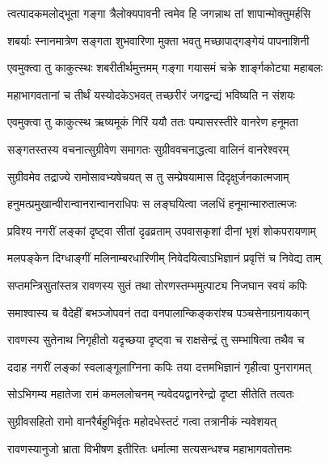 \twolineshloka
{त्वत्पादकमलोद्भूता गङ्गा त्रैलोक्यपावनी}
{त्वमेव हि जगन्नाथ तां शापान्मोक्तुमर्हसि}%




\twolineshloka
{शबर्याः स्नानमात्रेण सङ्गता शुभवारिणा}
{मुक्ता भवतु मच्छापाद्गङ्गेयं पापनाशिनी}%

\twolineshloka
{एवमुक्त्वा तु काकुत्स्थः शबरीतीर्थमुत्तमम्}
{गङ्गा गयासमं चक्रे शार्ङ्गकोट्या महाबलः}%

\twolineshloka
{महाभागवतानां च तीर्थं यस्योदकेऽभवत्}
{तच्छरीरं जगद्वन्द्यं भविष्यति न संशयः}%

\twolineshloka
{एवमुक्त्वा तु काकुत्स्थ ऋष्यमूकं गिरिं ययौ}
{ततः पम्पासरस्तीरे वानरेण हनूमता}%

\twolineshloka
{सङ्गतस्तस्य वचनात्सुग्रीवेण समागतः}
{सुग्रीववचनाद्धत्वा वालिनं वानरेश्वरम्}%

\twolineshloka
{सुग्रीवमेव तद्राज्ये रामोसावभ्यषेचयत्}
{स तु सम्प्रेषयामास दिदृक्षुर्जनकात्मजाम्}%

\twolineshloka
{हनुमत्प्रमुखान्वीरान्वानरान्वानराधिपः}
{स लङ्घयित्वा जलधिं हनूमान्मारुतात्मजः}%

\twolineshloka
{प्रविश्य नगरीं लङ्कां दृष्ट्वा सीतां दृढव्रताम्}
{उपवासकृशां दीनां भृशं शोकपरायणाम्}%

\twolineshloka
{मलपङ्केन दिग्धाङ्गीं मलिनाम्बरधारिणीम्}
{निवेदयित्वाऽभिज्ञानं प्रवृत्तिं च निवेद्य ताम्}%

\twolineshloka
{सप्तमन्त्रिसुतांस्तत्र रावणस्य सुतं तथा}
{तोरणस्तम्भमुत्पाट्य निजघान स्वयं कपिः}%

\twolineshloka
{समाश्वास्य च वैदेहीं बभञ्जोपवनं तदा}
{वनपालान्किङ्करांश्च पञ्चसेनाग्रनायकान्}%

\twolineshloka
{रावणस्य सुतेनाथ निगृहीतो यदृच्छया}
{दृष्ट्वा च राक्षसेन्द्रं तु सम्भाषित्वा तथैव च}%

\twolineshloka
{ददाह नगरीं लङ्कां स्वलाङ्गूलाग्निना कपिः}
{तया दत्तमभिज्ञानं गृहीत्वा पुनरागमत्}%

\twolineshloka
{सोऽभिगम्य महातेजा रामं कमललोचनम्}
{न्यवेदयद्वानरेन्द्रो दृष्टा सीतेति तत्वतः}%

\twolineshloka
{सुग्रीवसहितो रामो वानरैर्बहुभिर्वृतः}
{महोदधेस्तटं गत्वा तत्रानीकं न्यवेशयत्}%

\twolineshloka
{रावणस्यानुजो भ्राता विभीषण इतीरितः}
{धर्मात्मा सत्यसन्धश्च महाभागवतोत्तमः}%

